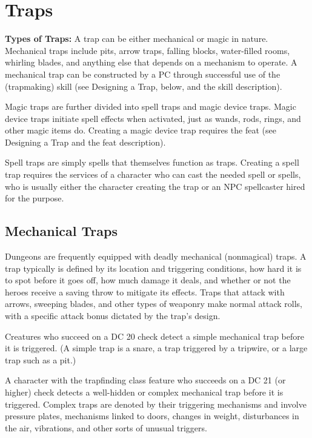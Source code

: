 \section{Traps}

\textbf{Types of Traps:} A trap can be either mechanical or magic in nature. Mechanical traps include pits, arrow traps, falling blocks, water-filled rooms, whirling blades, and anything else that depends on a mechanism to operate. A mechanical trap can be constructed by a PC through successful use of the  (trapmaking) skill (see Designing a Trap, below, and the skill description).

Magic traps are further divided into spell traps and magic device traps. Magic device traps initiate spell effects when activated, just as wands, rods, rings, and other magic items do. Creating a magic device trap requires the  feat (see Designing a Trap and the feat description).

Spell traps are simply spells that themselves function as traps. Creating a spell trap requires the services of a character who can cast the needed spell or spells, who is usually either the character creating the trap or an NPC spellcaster hired for the purpose.

\subsection{Mechanical Traps}
Dungeons are frequently equipped with deadly mechanical (nonmagical) traps. A trap typically is defined by its location and triggering conditions, how hard it is to spot before it goes off, how much damage it deals, and whether or not the heroes receive a saving throw to mitigate its effects. Traps that attack with arrows, sweeping blades, and other types of weaponry make normal attack rolls, with a specific attack bonus dictated by the trap’s design.

Creatures who succeed on a DC 20  check detect a simple mechanical trap before it is triggered. (A simple trap is a snare, a trap triggered by a tripwire, or a large trap such as a pit.)

A character with the trapfinding class feature who succeeds on a DC 21 (or higher)  check detects a well-hidden or complex mechanical trap before it is triggered. Complex traps are denoted by their triggering mechanisms and involve pressure plates, mechanisms linked to doors, changes in weight, disturbances in the air, vibrations, and other sorts of unusual triggers.

